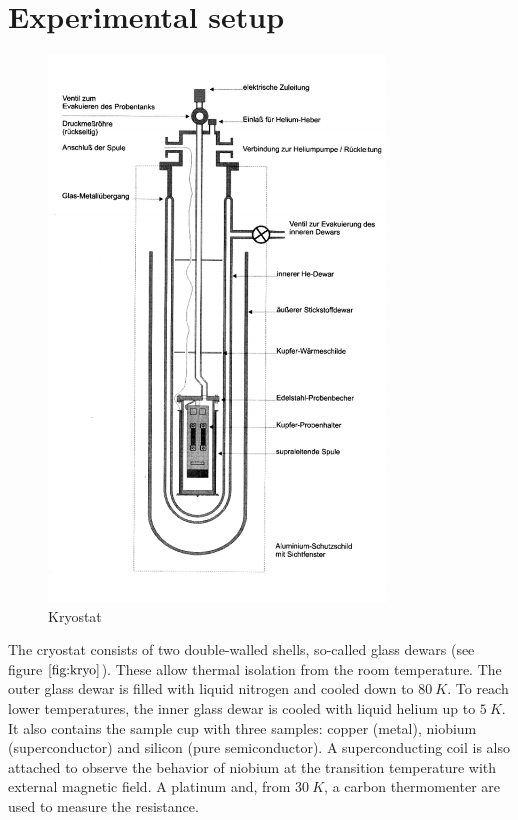 
\section{Experimental setup}
\label{sec:setup}


\begin{figure}
    \centering
    \includegraphics[width=0.8\textwidth]{./fig/kryo.png}
    \caption{Kryostat}
    \label{fig:kryo}
\end{figure}

The cryostat consists of two double-walled shells, so-called glass dewars (see figure $\autoref{fig:kryo}$). These allow thermal isolation from the room temperature. The outer glass dewar is filled with liquid nitrogen and cooled down to $\SI{80}{K}$. To reach lower temperatures, the inner glass dewar is cooled with liquid helium up to $\SI{5}{K}$. It also contains the sample cup with three samples: copper (metal), niobium (superconductor) and silicon (pure semiconductor). A superconducting coil is also attached to observe the behavior of niobium at the transition temperature with external magnetic field. 
A platinum and, from $\SI{30}{K}$, a carbon thermomenter are used to measure the resistance. 